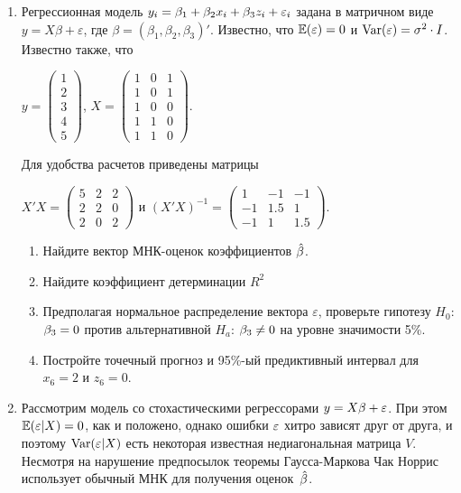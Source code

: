 \documentclass[12pt, a4paper]{article}\usepackage[]{graphicx}\usepackage[]{color}
\begin{document}
\begin{enumerate}
\item Регрессионная модель $y_i=\beta_1 + \beta_2 x_i + \beta_3 z_i + \varepsilon_i$  задана в матричном виде  $y=X\beta+\varepsilon$, где $\beta=(\beta_1,\beta_2,\beta_3)'$.
Известно, что $\mathbb{E}(\varepsilon)=0$  и  $\operatorname{Var}(\varepsilon)=\sigma^2\cdot I$.
Известно также, что

$y=\left(
\begin{array}{c}
1\\
2\\
3\\
4\\
5
\end{array}\right)$,
$X=\left(\begin{array}{ccc}
1 & 0 & 1 \\
1 & 0 & 1 \\
1 & 0 & 0 \\
1 & 1 & 0 \\
1 & 1 & 0
\end{array}\right)$.


Для удобства расчетов приведены матрицы


$X'X=\left(
\begin{array}{ccc}
5 & 2 & 2\\
2 & 2 & 0\\
2 & 0 & 2
\end{array}\right)$ и $(X'X)^{-1}=\left(
\begin{array}{ccc}
1 & -1 & -1 \\
-1 & 1.5 & 1 \\
-1 & 1 & 1.5
\end{array}\right)$.

\begin{enumerate}
\item Найдите вектор МНК-оценок коэффициентов $\hat{\beta}$.
\item Найдите коэффициент детерминации $R^2$
\item Предполагая нормальное распределение вектора $\varepsilon$, проверьте гипотезу $H_0$: $\beta_3=0$ против альтернативной $H_a$: $\beta_3\neq 0$ на уровне значимости 5\%.
\item Постройте точечный прогноз и 95\%-ый предиктивный интервал для $x_6=2$ и $z_6=0$.
\end{enumerate}


\item Рассмотрим модель со стохастическими регрессорами $y=X\beta + \varepsilon$. При этом $\mathbb{E}(\varepsilon|X)=0$, как и положено, однако ошибки $\varepsilon$ хитро зависят друг от друга, и поэтому $\operatorname{Var}(\varepsilon|X)$ есть некоторая известная недиагональная матрица $V$. Несмотря на нарушение предпосылок теоремы Гаусса-Маркова Чак Норрис использует обычный МНК для получения оценок~$\hat{\beta}$.


\end{enumerate}
\end{document}
